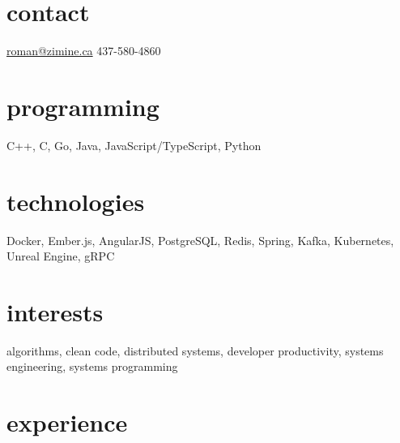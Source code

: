 \documentclass[]{zimine-cv}
\begin{document}

\pagecolor{bgbase1}

\begin{aside}
  \section{contact}
    \href{mailto:roman@zimine.ca}{roman@zimine.ca}
    437-580-4860
  \section{programming}
    C++, C, Go,
    Java, JavaScript/TypeScript,
    Python
  \section{technologies}
    Docker, Ember.js, AngularJS, PostgreSQL, Redis, Spring, Kafka, Kubernetes, Unreal Engine, gRPC
\end{aside}

\section{interests}

algorithms, clean code, distributed systems, developer productivity, systems engineering, systems programming


\section{experience}
\end{document}

